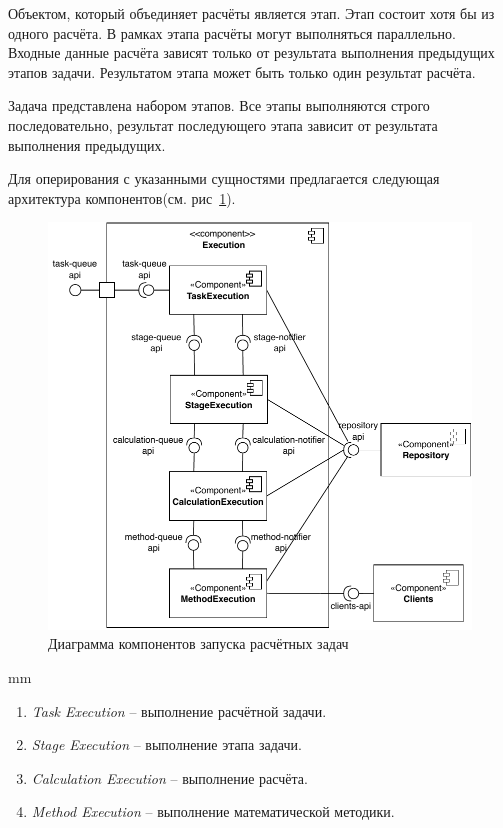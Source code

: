 Объектом, который объединяет расчёты является этап. Этап состоит хотя бы из одного расчёта. В рамках этапа
расчёты могут выполняться параллельно. Входные данные расчёта зависят только от результата выполнения предыдущих этапов
задачи. Результатом этапа может быть только один результат расчёта.

Задача представлена набором этапов. Все этапы выполняются строго последовательно, результат последующего этапа
зависит от результата выполнения предыдущих.

Для оперирования с указанными сущностями предлагается следующая архитектура
компонентов(см. рис\ \ref{pic:architecture__orchestrator-detailed-component}).

\begin{figure}[H]
	\includegraphics[width=\textwidth]{architecture/pictures/orchestrator/component_detailed}
	\caption{Диаграмма компонентов запуска расчётных задач}
	\label{pic:architecture__orchestrator-detailed-component}
\end{figure}
 mm

\begin{enumerate}
	\item {
		\textit{Task Execution} -- выполнение расчётной задачи.
	}
	\item {
		\textit{Stage Execution} -- выполнение этапа задачи.
	}
	\item {
		\textit{Calculation Execution} -- выполнение расчёта.
	}
	\item {
		\textit{Method Execution} -- выполнение математической методики.
	}
\end{enumerate}


